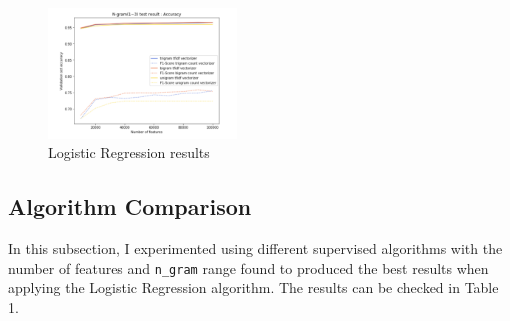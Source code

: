 \documentclass{article}
\begin{document}
	\begin{figure}[h]
		\label{Figure 14}
		\caption{Logistic Regression results}
		\includegraphics[width=50mm]{LR.png}
		\centering
	\end{figure}


	\subsection{Algorithm Comparison}
	
	In this subsection, I experimented using different supervised algorithms with the number of features and \texttt{n\_gram} range found to produced the best results when applying the Logistic Regression algorithm. The results can be checked in Table 1. 
	
\end{document}
